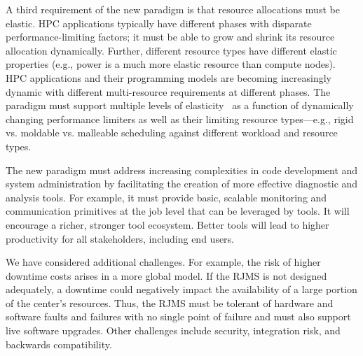 A third requirement of the new paradigm is that resource allocations
must be elastic. HPC applications typically have different
phases with disparate performance-limiting factors;
it must be able to grow and shrink its resource allocation
dynamically. Further, different resource types have different
elastic properties 
(e.g., power is a much more elastic resource than compute nodes).
HPC applications and their programming models are
becoming increasingly dynamic with different multi-resource requirements
at different phases. 
The paradigm must support multiple levels of elasticity~\cite{Convergence} 
as a function of dynamically changing performance limiters
as well as their limiting resource types---e.g., 
rigid vs. moldable vs. malleable scheduling 
against different workload and resource types.

The new paradigm must address increasing complexities
in code development and system administration by facilitating
the creation of more effective diagnostic and analysis tools.
For example, it must provide basic, scalable monitoring and communication
primitives at the job level that can be leveraged by tools.
It will encourage a richer, stronger tool ecosystem.
Better tools will lead to higher productivity for all
stakeholders, including end users.

We have considered additional challenges. For example,
the risk of higher downtime costs arises in a more global model.
If the RJMS is not designed adequately, a downtime could negatively
impact the availability of a large portion of the center's
resources. Thus, the RJMS must be tolerant of hardware and software
faults and failures with no single point of failure and must
also support live software upgrades. 
Other challenges include security, integration risk, 
and backwards compatibility. 

%
